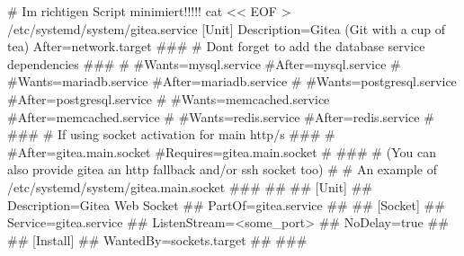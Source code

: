 \documentclass[
  letterpaper,
  DIV=11]{scrreprt}
\newenvironment{Shaded}{\begin{snugshade}}{\end{snugshade}}
\newcommand{\CommentTok}[1]{\textcolor[rgb]{0.37,0.37,0.37}{#1}}
\newcommand{\FunctionTok}[1]{\textcolor[rgb]{0.28,0.35,0.67}{#1}}
\newcommand{\NormalTok}[1]{\textcolor[rgb]{0.00,0.23,0.31}{#1}}
\newcommand{\OperatorTok}[1]{\textcolor[rgb]{0.37,0.37,0.37}{#1}}
\newcommand{\StringTok}[1]{\textcolor[rgb]{0.13,0.47,0.30}{#1}}
\begin{document}
\begin{Shaded}
\begin{Highlighting}[]
\CommentTok{\# Im richtigen Script minimiert!!!!!}
\FunctionTok{cat} \OperatorTok{\textless{}\textless{} EOF} \OperatorTok{\textgreater{}}\NormalTok{ /etc/systemd/system/gitea.service}
\StringTok{ }
\StringTok{[Unit]}
\StringTok{Description=Gitea (Git with a cup of tea)}
\StringTok{After=network.target}
\StringTok{\#\#\#}
\StringTok{\# Don\textquotesingle{}t forget to add the database service dependencies}
\StringTok{\#\#\#}
\StringTok{\#}
\StringTok{\#Wants=mysql.service}
\StringTok{\#After=mysql.service}
\StringTok{\#}
\StringTok{\#Wants=mariadb.service}
\StringTok{\#After=mariadb.service}
\StringTok{\#}
\StringTok{\#Wants=postgresql.service}
\StringTok{\#After=postgresql.service}
\StringTok{\#}
\StringTok{\#Wants=memcached.service}
\StringTok{\#After=memcached.service}
\StringTok{\#}
\StringTok{\#Wants=redis.service}
\StringTok{\#After=redis.service}
\StringTok{\#}
\StringTok{\#\#\#}
\StringTok{\# If using socket activation for main http/s}
\StringTok{\#\#\#}
\StringTok{\#}
\StringTok{\#After=gitea.main.socket}
\StringTok{\#Requires=gitea.main.socket}
\StringTok{\#}
\StringTok{\#\#\#}
\StringTok{\# (You can also provide gitea an http fallback and/or ssh socket too)}
\StringTok{\#}
\StringTok{\# An example of /etc/systemd/system/gitea.main.socket}
\StringTok{\#\#\#}
\StringTok{\#\#}
\StringTok{\#\# [Unit]}
\StringTok{\#\# Description=Gitea Web Socket}
\StringTok{\#\# PartOf=gitea.service}
\StringTok{\#\#}
\StringTok{\#\# [Socket]}
\StringTok{\#\# Service=gitea.service}
\StringTok{\#\# ListenStream=\textless{}some\_port\textgreater{}}
\StringTok{\#\# NoDelay=true}
\StringTok{\#\#}
\StringTok{\#\# [Install]}
\StringTok{\#\# WantedBy=sockets.target}
\StringTok{\#\#}
\StringTok{\#\#\#}


\end{Highlighting}
\end{Shaded}
\end{document}

